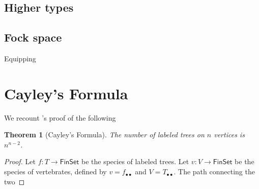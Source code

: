 \documentclass[fleqn]{article}
\newcommand{\finset}{\mathsf{FinSet}}
\theoremstyle{theorem}
\newtheorem{thm}{Theorem}
\theoremstyle{definition}
\begin{document}
\subsection{Higher types}





\subsection{Fock space}
Equipping 






\section{Cayley's Formula}
We recount \citeauthor{Joyal1981}'s proof of the following
\begin{thm}[Cayley's Formula] 
  The number of labeled trees on $n$ vertices is $n^{n-2}$.
\end{thm}

\begin{proof}
Let $f : T \to \finset$ be the species of labeled trees.  Let $v : V \to
\finset$ be the species of vertebrates, defined by $v = f_{\bullet\bullet}$ and
$V = T_{\bullet\bullet}$.  The path connecting the two 
\end{proof}








\end{document}
